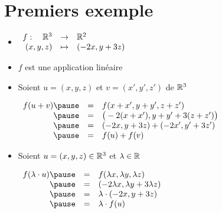 \section{Premiers exemple}

\begin{frame}
\begin{exemple}
\begin{itemize}\setlength{\itemsep}{6pt}
  \item $\begin{array}{rcl}
f : \quad \mathbb{R}^3 & \to & \mathbb{R}^2\\
(x,y,z) & \mapsto & (-2x,y+3z)
 \end{array}$

 \pause
 
  \item $f$ est une application linéaire
 
 \pause
 
  \item Soient $u=(x,y,z)$ et $v=(x',y',z')$ de $\mathbb{R}^3$
  
$\begin{array}{rcl}
f(u+v) \pause & = &f(x+x', y+y', z+z')\\
       \pause & = & \big(-2(x+x'), y+y' + 3(z+z')\big)\\
       \pause & = & (-2x, y+3z)+(-2x', y'+3z')\\
       \pause & = & f(u)+f(v)
\end{array}$

 \pause
 
  \item  Soient $u=(x,y,z) \in \mathbb{R}^3$ et $\lambda \in \mathbb{R}$

$\begin{array}{rcl}
f(\lambda \cdot u) \pause & = & f(\lambda x, \lambda y, \lambda z)\\
             \pause & = & (-2\lambda x,   \lambda y + 3\lambda z)\\
             \pause & = & \lambda \cdot (-2x,y+3z)\\
             \pause & = & \lambda\cdot f(u)
\end{array}$
\end{itemize}
\end{exemple}
\end{frame}


